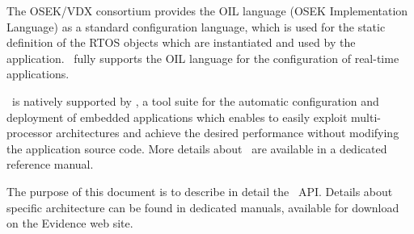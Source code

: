The OSEK/VDX consortium provides the OIL language (OSEK Implementation 
Language) as a standard configuration language, which is used for the 
static definition of the RTOS objects which are instantiated and used 
by the application. \ee\ fully supports the OIL language for the 
configuration of real-time applications.

\ee\ is natively supported by \rtd, a tool suite for the automatic 
configuration and deployment of embedded applications which enables to 
easily exploit multi-processor architectures and achieve the desired 
performance without modifying the application source code. More details
about \rtd\ are available in a dedicated reference manual.

The purpose of this document is to describe in detail the \ee\
API. Details about specific architecture can be found in dedicated manuals,
available for download on the Evidence web site.



